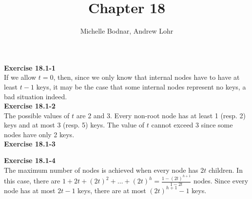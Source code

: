 \documentclass{article}
\title{Chapter 18}
\author{Michelle Bodnar, Andrew Lohr}
\begin{document}
\maketitle


\noindent\textbf{Exercise 18.1-1}\\

If we allow $t=0$, then, since we only know that internal nodes have to have at least $t-1$ keys, it may be the case that some internal nodes represent no keys, a bad situation indeed.\\

\noindent\textbf{Exercise 18.1-2}\\

The possible values of $t$ are 2 and 3.  Every non-root node has at least 1 (resp. 2) keys and at most 3 (resp. 5) keys.  The value of $t$ cannot exceed 3 since some nodes have only 2 keys. \\

\noindent\textbf{Exercise 18.1-3}\\





\noindent\textbf{Exercise 18.1-4}\\

The maximum number of nodes is achieved when every node has $2t$ children.  In this case, there are $1 + 2t + (2t)^2 + \ldots + (2t)^h = \frac{1-(2t)^{h+1}}{1-2t}$ nodes.  Since every node has at most $2t-1$ keys, there are at most $(2t)^{h+1} - 1$ keys. \\
\end{document}

